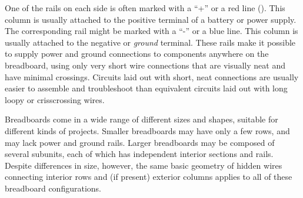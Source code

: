 One of the rails on each side is often marked with a ``+'' or a red line ().
This column is usually attached to the positive terminal of a battery or power supply.
The corresponding rail might be marked with a ``-'' or a blue line.
This column is usually attached to the negative or \emph{ground} terminal.
These rails make it possible to supply power and ground connections to components anywhere on the breadboard, using only very short wire connections that are visually neat and have minimal crossings.
Circuits laid out with short, neat connections are usually easier to assemble and troubleshoot than equivalent circuits laid out with long loopy or crisscrossing wires.

Breadboards come in a wide range of different sizes and shapes, suitable for different kinds of projects.
Smaller breadboards may have only a few rows, and may lack power and ground rails.
Larger breadboards may be composed of several subunits, each of which has independent interior sections and rails.
Despite differences in size, however, the same basic geometry of hidden wires connecting interior rows and (if present) exterior columns applies to all of these breadboard configurations.

